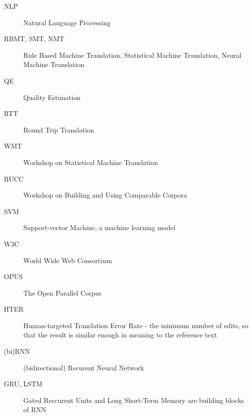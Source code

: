 
\begin{description}
	
	\item[NLP] Natural Language Processing
	
	\item[RBMT, SMT, NMT] Rule Based Machine Translation, Statistical Machine Translation, Neural Machine Translation

    \item[QE] Quality Estimation
	
	\item[RTT] Round Trip Translation
	
	\item[WMT] Workshop on Statistical Machine Translation
	
	\item[BUCC] Workshop on Building and Using Comparable Corpora
	
	\item[SVM] Support-vector Machine, a machine learning model
	
	\item[W3C] World Wide Web Consortium
	
	\item[OPUS] The Open Parallel Corpus
	
	\item[HTER] Human-targeted Translation Error Rate - the minimum number of edits, so that the result is similar enough in meaning to the reference text
	
	\item[(bi)RNN] (bidirectional) Recurent Neural Network
	
	\item[GRU, LSTM] Gated Reccurent Units and Long Short-Term Memory are building blocks of RNN
	
\end{description}
